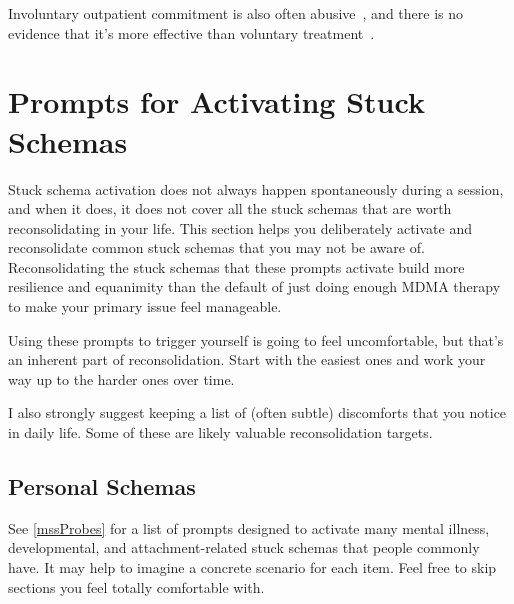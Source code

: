 \documentclass[11pt,oneside]{book}
\let\cite\parencite
\begin{document}
Involuntary outpatient commitment is also often abusive~\cite{croftAOC}, and there is no evidence that it's more effective than voluntary treatment~\cite{kiselySystematicReviewMetaanalysis2025}.

\chapter{Prompts for Activating Stuck Schemas}
\label{mapping}
Stuck schema activation does not always happen spontaneously during a session, and when it does, it does not cover all the stuck schemas that are worth reconsolidating in your life. This section helps you deliberately activate and reconsolidate common stuck schemas that you may not be aware of. Reconsolidating the stuck schemas that these prompts activate build more resilience and equanimity than the default of just doing enough MDMA therapy to make your primary issue feel manageable.

Using these prompts to trigger yourself is going to feel uncomfortable, but that's an inherent part of reconsolidation. Start with the easiest ones and work your way up to the harder ones over time.

I also strongly suggest keeping a list of (often subtle) discomforts that you notice in daily life. Some of these are likely valuable reconsolidation targets.
\section{Personal Schemas}
See \cref{mssProbes} for a list of prompts designed to activate many mental illness, developmental, and attachment-related stuck schemas that people commonly have. It may help to imagine a concrete scenario for each item. Feel free to skip sections you feel totally comfortable with.
\end{document}
